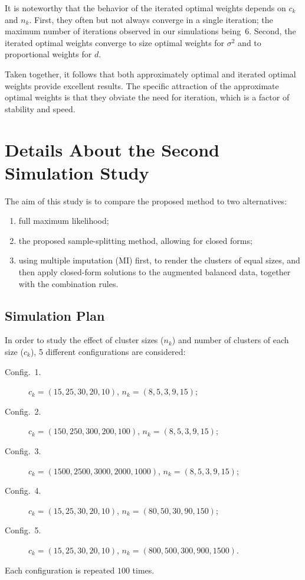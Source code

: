 \documentclass[11pt,a5paper,twoside]{book}
\begin{document}
{It is noteworthy that the behavior of the iterated optimal weights depends on $c_k$ and $n_k$. First, they often but not always converge in a single iteration; the maximum number of iterations observed in our simulations being~6. Second, the iterated optimal weights  converge to size optimal weights for $\sigma^2$ and to proportional weights for $d$.

Taken together, it follows that both approximately optimal and iterated optimal weights provide excellent results. The specific attraction of the approximate optimal weights is that they obviate the need for iteration, which is a factor of stability and speed.


\section{Details About the Second Simulation Study}
\label{simapptwee}

The aim of this study is to compare the proposed method to two alternatives: 
\begin{enumerate}
\item full maximum likelihood;
\item the proposed  sample-splitting method, allowing for closed forms;
\item using multiple imputation (MI) first, to render the clusters of equal sizes, and then apply closed-form solutions to the augmented balanced data, together with the combination rules.
\end{enumerate}

\subsection{Simulation Plan}

In order to study the effect of cluster sizes ($n_k$) and number of clusters of each size ($c_k$), 5 different configurations are considered:
\begin{description}
\item[Config.~1.] $c_k=(15,25,30,20,10)$, $n_k=(8,5,3,9,15)$;
\item[Config.~2.] $c_k=(150,250,300,200,100)$, $n_k=(8,5,3,9,15)$;
\item[Config.~3.] $c_k=(1500,2500,3000,2000,1000)$, $n_k=(8,5,3,9,15)$;
\item[Config.~4.] $c_k=(15,25,30,20,10)$, $n_k=(80,50,30,90,150)$;
\item[Config.~5.] $c_k=(15,25,30,20,10)$, $n_k=(800,500,300,900,1500)$.
\end{description}
 Each configuration is repeated $100$ times.

}
\end{document}
